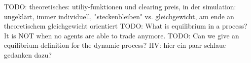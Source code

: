\documentclass[../Bachelorarbeit.tex]{subfiles}
\begin{document}
\medskip

TODO: theoretisches: utiliy-funktionen und clearing preis, in der simulation: ungeklärt, immer individuell, "steckenbleiben" vs. gleichgewicht, am ende an theoretischem gleichgewicht orientiert
TODO: What is equilibrium in a process? It is NOT when no agents are able to trade anymore.
TODO: Can we give an equilibrium-definition for the dynamic-process? HV: hier ein paar schlaue gedanken dazu?
\end{document}
